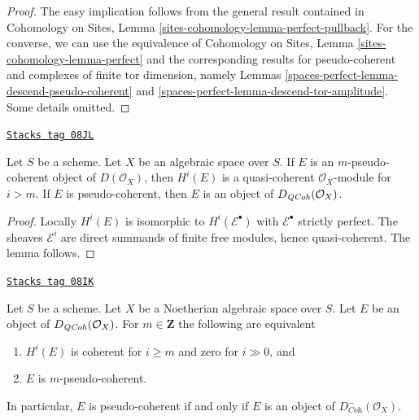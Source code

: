 \begin{proof}
The easy implication follows from the general result contained in
Cohomology on Sites, Lemma \ref{sites-cohomology-lemma-perfect-pullback}.
For the converse, we can use the equivalence of
Cohomology on Sites, Lemma \ref{sites-cohomology-lemma-perfect}
and the corresponding results for pseudo-coherent and complexes of
finite tor dimension, namely
Lemmas \ref{spaces-perfect-lemma-descend-pseudo-coherent} and
\ref{spaces-perfect-lemma-descend-tor-amplitude}.
Some details omitted.
\end{proof}

\begin{lemma}
\label{spaces-perfect-lemma-pseudo-coherent}
\href{https://stacks.math.columbia.edu/tag/08JL}{\texttt{Stacks tag 08JL}}

Let $S$ be a scheme. Let $X$ be an algebraic space over $S$.
If $E$ is an $m$-pseudo-coherent object of $D(\mathcal{O}_X)$,
then $H^i(E)$ is a quasi-coherent $\mathcal{O}_X$-module for $i > m$.
If $E$ is pseudo-coherent, then $E$ is an object of
$D_{\mathit{QCoh}}(\mathcal{O}_X)$.
\end{lemma}

\begin{proof}
Locally $H^i(E)$ is isomorphic to $H^i(\mathcal{E}^\bullet)$
with $\mathcal{E}^\bullet$ strictly perfect. The sheaves
$\mathcal{E}^i$ are direct summands of finite free modules,
hence quasi-coherent. The lemma follows.
\end{proof}

\begin{lemma}
\label{spaces-perfect-lemma-identify-pseudo-coherent-noetherian}
\href{https://stacks.math.columbia.edu/tag/08IK}{\texttt{Stacks tag 08IK}}

Let $S$ be a scheme. Let $X$ be a Noetherian algebraic space over $S$.
Let $E$ be an object of $D_{\mathit{QCoh}}(\mathcal{O}_X)$. For
$m \in \mathbf{Z}$ the following are equivalent
\begin{enumerate}
\item $H^i(E)$ is coherent for $i \geq m$ and zero for $i \gg 0$, and
\item $E$ is $m$-pseudo-coherent.
\end{enumerate}
In particular, $E$ is pseudo-coherent if and only if $E$ is an object
of $D^-_{\textit{Coh}}(\mathcal{O}_X)$.
\end{lemma}

